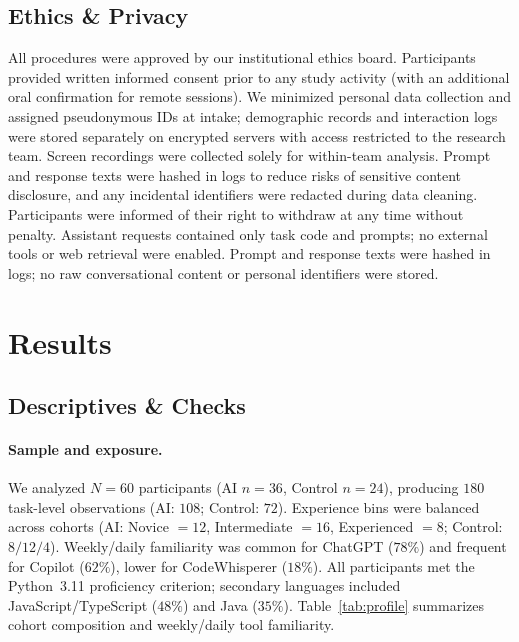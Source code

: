 \documentclass[sigconf]{acmart}
\begin{document}
\subsection{Ethics \& Privacy}
\label{sec:ethics}

All procedures were approved by our institutional ethics board. Participants provided written informed consent prior to any study activity (with an additional oral confirmation for remote sessions). We minimized personal data collection and assigned pseudonymous IDs at intake; demographic records and interaction logs were stored separately on encrypted servers with access restricted to the research team. Screen recordings were collected solely for within-team analysis. Prompt and response texts were hashed in logs to reduce risks of sensitive content disclosure, and any incidental identifiers were redacted during data cleaning. Participants were informed of their right to withdraw at any time without penalty. Assistant requests contained only task code and prompts; no external tools or web retrieval were enabled. Prompt and response texts were hashed in logs; no raw conversational content or personal identifiers were stored.


\section{Results}
\label{sec:results}

\subsection{Descriptives \& Checks}
\label{sec:descriptives}

\paragraph{Sample and exposure.}
We analyzed $N=60$ participants (AI $n{=}36$, Control $n{=}24$), producing $180$ task-level observations (AI: $108$; Control: $72$). Experience bins were balanced across cohorts (AI: Novice $=12$, Intermediate $=16$, Experienced $=8$; Control: $8/12/4$). Weekly/daily familiarity was common for ChatGPT ($78\%$) and frequent for Copilot ($62\%$), lower for CodeWhisperer ($18\%$). All participants met the Python~3.11 proficiency criterion; secondary languages included JavaScript/TypeScript ($48\%$) and Java ($35\%$). Table~\ref{tab:profile} summarizes cohort composition and weekly/daily tool familiarity.
\end{document}
